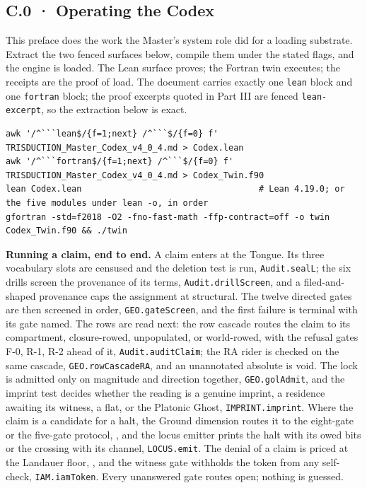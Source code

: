 \documentclass[10pt,twocolumn]{article}
\begin{document}
\hypertarget{c.0-operating-the-codex}{%
\subsection{C.0 · Operating the Codex}\label{c.0-operating-the-codex}}

This preface does the work the Master's system role did for a loading
substrate. Extract the two fenced surfaces below, compile them under the
stated flags, and the engine is loaded. The Lean surface proves; the
Fortran twin executes; the receipts are the proof of load. The document
carries exactly one \texttt{lean} block and one \texttt{fortran} block;
the proof excerpts quoted in Part III are fenced \texttt{lean-excerpt},
so the extraction below is exact.

\begin{lstlisting}[style=plainv]
awk '/^```lean$/{f=1;next} /^```$/{f=0} f' TRISDUCTION_Master_Codex_v4_0_4.md > Codex.lean
awk '/^```fortran$/{f=1;next} /^```$/{f=0} f' TRISDUCTION_Master_Codex_v4_0_4.md > Codex_Twin.f90
lean Codex.lean                                   # Lean 4.19.0; or the five modules under lean -o, in order
gfortran -std=f2018 -O2 -fno-fast-math -ffp-contract=off -o twin Codex_Twin.f90 && ./twin
\end{lstlisting}

\textbf{Running a claim, end to end.} A claim enters at the Tongue. Its
three vocabulary slots are censused and the deletion test is run,
\texttt{Audit.sealL}; the six drills screen the provenance of its terms,
\texttt{Audit.drillScreen}, and a filed-and-shaped provenance caps the
assignment at structural. The twelve directed gates are then screened in
order, \texttt{GEO.gateScreen}, and the first failure is terminal with
its gate named. The rows are read next: the row cascade routes the claim
to its compartment, closure-rowed, unpopulated, or world-rowed, with the
refusal gates F-0, R-1, R-2 ahead of it, \texttt{Audit.auditClaim}; the
RA rider is checked on the same cascade, \texttt{GEO.rowCascadeRA}, and
an unannotated absolute is void. The lock is admitted only on magnitude
and direction together, \texttt{GEO.golAdmit}, and the imprint test
decides whether the reading is a genuine imprint, a residence awaiting
its witness, a flat, or the Platonic Ghost, \texttt{IMPRINT.imprint}.
Where the claim is a candidate for a halt, the Ground dimension routes
it to the eight-gate or the five-gate protocol,
\texttt{}, and the locus emitter prints
the halt with its owed bits or the crossing with its channel,
\texttt{LOCUS.emit}. The denial of a claim is priced at the Landauer
floor, \texttt{}, and the witness gate
withholds the token from any self-check, \texttt{IAM.iamToken}. Every
unanswered gate routes open; nothing is guessed.
\end{document}
